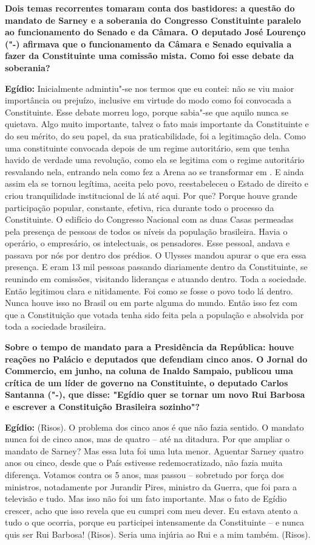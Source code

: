 \textbf{Dois temas recorrentes tomaram conta dos bastidores: a questão
do mandato de Sarney e a soberania do Congresso Constituinte paralelo ao
funcionamento do Senado e da Câmara. O deputado José Lourenço ("-)
afirmava que o funcionamento da Câmara e Senado equivalia a fazer da
Constituinte uma comissão mista. Como foi esse debate da soberania?}

\textbf{Egídio:} Inicialmente admintiu"-se nos termos que eu contei: não
se viu maior importância ou prejuízo, inclusive em virtude do modo como
foi convocada a Constituinte. Esse debate morreu logo, porque sabia"-se
que aquilo nunca se quietava. Algo muito importante, talvez o fato mais
importante da Constituinte e do seu mérito, do seu papel, da sua
praticabilidade, foi a legitimação dela. Como uma constituinte convocada
depois de um regime autoritário, sem que tenha havido de verdade uma
revolução, como ela se legitima com o regime autoritário resvalando
nela, entrando nela como fez a Arena ao se transformar em . E ainda
assim ela se tornou legítima, aceita pelo povo, reestabeleceu o Estado
de direito e criou tranquilidade institucional de lá até aqui. Por que?
Porque houve grande participação popular, constante, efetiva, rica
durante todo o processo da Constituinte. O edifício do Congresso
Nacional com as duas Casas permeadas pela presença de pessoas de todos
os níveis da população brasileira. Havia o operário, o empresário, os
intelectuais, os pensadores. Esse pessoal, andava e passava por nós por
dentro dos prédios. O Ulysses mandou apurar o que era essa presença. E
eram 13 mil pessoas passando diariamente dentro da Constituinte, se
reunindo em comissões, visitando lideranças e atuando dentro. Toda a
sociedade. Então legitimou clara e nitidamente. Foi como se fosse o povo
todo lá dentro. Nunca houve isso no Brasil ou em parte alguma do mundo.
Então isso fez com que a Constituição que votada tenha sido feita pela a
população e absolvida por toda a sociedade brasileira.

\textbf{Sobre o tempo de mandato para a Presidência da República: houve
reações no Palácio e deputados que defendiam cinco anos. O Jornal do
Commercio, em junho, na coluna de Inaldo Sampaio, publicou uma crítica
de um líder de governo na Constituinte, o deputado Carlos Santanna
("-), que disse: "Egídio quer se tornar um novo Rui Barbosa e
escrever a Constituição Brasileira sozinho"?}

\textbf{Egídio:} (Risos). O problema dos cinco anos é que não fazia
sentido. O mandato nunca foi de cinco anos, mas de quatro -- até na
ditadura. Por que ampliar o mandato de Sarney? Mas essa luta foi uma
luta menor. Aguentar Sarney quatro anos ou cinco, desde que o País
estivesse redemocratizado, não fazia muita diferença. Votamos contra os
5 anos, mas passou -- sobretudo por força dos ministros, notadamente por
Jurandir Pires, ministro da Guerra, que foi para a televisão e tudo. Mas
isso não foi um fato importante. Mas o fato de Egídio crescer, acho que
isso revela que eu cumpri com meu dever. Eu estava atento a tudo o que
ocorria, porque eu participei intensamente da Constituinte -- e nunca
quis ser Rui Barbosa! (Risos). Seria uma injúria ao Rui e a mim também.
(Risos).

